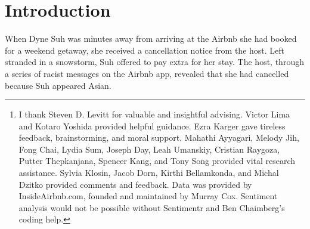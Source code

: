 \documentclass[11pt, oneside]{article}
\begin{document}
\begin{abstract}
Edelman and Luca (2014) estimate that Black Airbnb hosts in New York City earn 12\% less than White hosts for a similar type of listing in a similar neighborhood. However, their experiment is limited by a small sample size that controlled for a narrow set of covariates. Moreover, Airbnb has since expanded and changed their website, potentially influencing the extent of discrimination on the platform. I extend Edelman and Luca's research using data from a webscrape of nearly 70,000 Airbnb listings across 7 U.S. cities. After controlling for an extensive array of covariates including location, property characteristics, and host characteristics, I confirm their previous findings. I estimate that Black hosts earn \$5-\$7 less per night, and Asian hosts \$6-\$9 less per night (depending on the sex of the host), than White hosts who own a similar type of listing. Following this analysis, I explore various hypotheses for this effect. I find little evidence that this price difference is due to supply-side effects, such as minority hosts choosing to price their listings lower, or offering their listing up for rent for shorter periods of time than White hosts. I also find little evidence that this effect is due to minority hosts owning listings of worse quality. Overall, among the hypotheses I test, discrimination is the most convincing explanation for the persistent price disparity between minority hosts and White hosts on Airbnb.\footnote{I thank Steven D. Levitt for valuable and insightful advising. Victor Lima and Kotaro Yoshida provided helpful guidance. Ezra Karger gave tireless feedback, brainstorming, and moral support. Mahathi Ayyagari, Melody Jih, Fong Chai, Lydia Sum, Joseph Day, Leah Umanskiy, Cristian Raygoza, Putter Thepkanjana, Spencer Kang, and Tony Song provided vital research assistance. Sylvia Klosin, Jacob Dorn, Kirthi Bellamkonda, and Michal Dzitko provided comments and feedback. Data was provided by InsideAirbnb.com, founded and maintained by Murray Cox. Sentiment analysis would not be possible without Sentimentr and Ben Chaimberg's coding help. } \end{abstract}

\doublespacing
\section{Introduction} %

When Dyne Suh was minutes away from arriving at the Airbnb she had booked for a weekend getaway, she received a cancellation notice from the host. Left stranded in a snowstorm, Suh offered to pay extra for her stay. The host, through a series of racist messages on the Airbnb app, revealed that she had cancelled because Suh appeared Asian.\cite{diane}  
\end{document}

